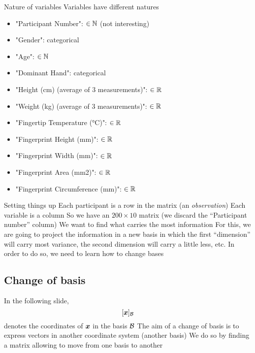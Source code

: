 \documentclass[aspectratio=169]{beamer}\usepackage[]{graphicx}\usepackage[]{xcolor}
\begin{document}
\begin{frame}{Nature of variables}
Variables have different natures
\vfill
\begin{itemize}
\item "Participant Number": $\in\mathbb{N}$ (not interesting)
\item "Gender": categorical
\item "Age": $\in\mathbb{N}$ 
\item "Dominant Hand": categorical
\item "Height (cm) (average of 3 measurements)": $\in\mathbb{R}$
\item "Weight (kg) (average of 3 measurements)": $\in\mathbb{R}$
\item "Fingertip Temperature (°C)": $\in\mathbb{R}$
\item "Fingerprint Height (mm)": $\in\mathbb{R}$
\item "Fingerprint Width (mm)": $\in\mathbb{R}$
\item "Fingerprint Area (mm2)": $\in\mathbb{R}$
\item "Fingerprint Circumference (mm)": $\in\mathbb{R}$
\end{itemize}
\end{frame}

\begin{frame}{Setting things up}
Each participant is a row in the matrix (an \emph{observation})
\vfill
Each variable is a column
\vfill
So we have an $200\times 10$ matrix (we discard the ``Participant number'' column)
\vfill
We want to find what carries the most information
\vfill
For this, we are going to project the information in a new basis in which the first ``dimension'' will carry most variance, the second dimension will carry a little less, etc.
\vfill
In order to do so, we need to learn how to change bases
\end{frame}

\subsection{Change of basis}
\begin{frame}
	In the following slide, 
	\[
	[\bm{x}]_{\mathcal{B}}
	\]
	denotes the coordinates of $\bm{x}$ in the basis $\mathcal{B}$
	\vfill
	The aim of a change of basis is to express vectors in another coordinate system (another basis)
	\vfill
	We do so by finding a matrix allowing to move from one basis to another
\end{frame}
\end{document}

